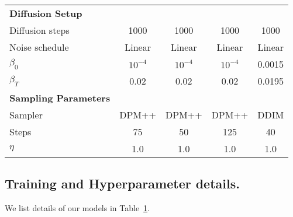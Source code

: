\documentclass{article} \usepackage{iclr2024_conference,times}
\begin{document}
\begin{table}[h]
{\begin{tabular}{lcccc}
  
    \textbf{Diffusion Setup}  &  &  & \\
    Diffusion steps & 1000 & 1000 & 1000 & 1000 \\
    Noise schedule & Linear & Linear & Linear & Linear \\
    $\beta_{0}$ & $10^{-4}$ & $10^{-4}$ &$10^{-4}$ & 0.0015 \\
    $\beta_{T}$ & 0.02 & 0.02 & 0.02 & 0.0195\\
    \midrule\midrule
    \textbf{Sampling Parameters}  &  &  & \\
    Sampler  &  DPM++ & DPM++   & DPM++ & DDIM  \\
    Steps  & 75 & 50  & 125 & 40 \\
    $\eta$  & 1.0 & 1.0  & 1.0  & 1.0 \\
    \bottomrule
\end{tabular}
}
\label{table:hyperparameters_ablation}
\vspace{-0.4cm}
\end{table} \subsection{Training and Hyperparameter details.} We list details of our models in Table~\ref{table:hyperparameters_ablation}.
\end{document}
